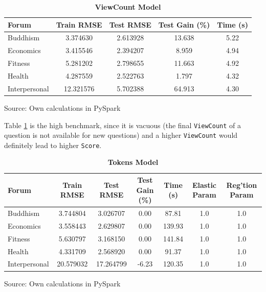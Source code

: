\documentclass[11pt,preprint, authoryear]{article}
\numberwithin{equation}{section}
\begin{document}
\begin{longtable}[htbp] {@{} lcccc @{}} 
\caption{\textbf{ViewCount Model}} 
\label{tab:vc_model} \\
\toprule
\textbf{Forum} &  \textbf{Train RMSE} &  \textbf{Test RMSE} &  \textbf{Test Gain (\%)} &  \textbf{Time (s)} \\
\midrule
Buddhism      &             3.374630 &          2.613928 &             13.638 &               5.22 \\
Economics     &             3.415546 &          2.394207 &              8.959 &               4.94 \\
Fitness       &             5.281202 &          2.798655 &             11.663 &               4.92 \\
Health        &             4.287559 &          2.522763 &              1.797 &               4.32 \\
Interpersonal &            12.321576 &          5.702388 &             64.913 &               4.30 \\
\bottomrule
\end{longtable}\begin{center} Source: Own calculations in PySpark\end{center}

\normalsize

Table \ref{tab:vc_model} is the high benchmark, since it is vacuous (the
final \texttt{ViewCount} of a question is not available for new
questions) and a higher \texttt{ViewCount} would definitely lead to
higher \texttt{Score}.

\footnotesize

\begin{longtable}[htbp] {@{} lcccccc @{}} 
\caption{\textbf{Tokens Model}} 
\label{tab:token_model} \\
\toprule
\textbf{Forum} &  \textbf{Train RMSE} &  \textbf{Test RMSE} &  \textbf{Test Gain (\%)} &  \textbf{Time (s)} & \textbf{Elastic Param} &  \textbf{Reg'tion Param} \\
\midrule
Buddhism      &          3.744804 &       3.026707 &           0.00 &           87.81 &               1.0 &               1.0 \\
Economics     &          3.558443 &       2.629807 &           0.00 &          139.93 &               1.0 &               1.0 \\
Fitness       &          5.630797 &       3.168150 &           0.00 &          141.84 &               1.0 &               1.0 \\
Health        &          4.331709 &       2.568920 &           0.00 &           91.37 &               1.0 &               1.0 \\
Interpersonal &         20.579032 &      17.264799 &           -6.23 &          120.35 &               1.0 &               1.0 \\
\bottomrule
\end{longtable}\begin{center} Source: Own calculations in PySpark\end{center}
\end{document}
